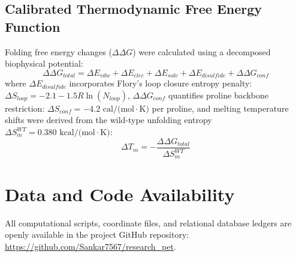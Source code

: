 \documentclass[journal=natcat,manuscript=article]{achemso}
\begin{document}
\subsection{Calibrated Thermodynamic Free Energy Function}
Folding free energy changes ($\Delta\Delta G$) were calculated using a decomposed biophysical potential:
\begin{equation}
\Delta\Delta G_{total} = \Delta E_{vdw} + \Delta E_{elec} + \Delta E_{solv} + \Delta E_{disulfide} + \Delta\Delta G_{conf}
\end{equation}
where $\Delta E_{disulfide}$ incorporates Flory's loop closure entropy penalty: $\Delta S_{loop} = -2.1 - 1.5 R \ln(N_{loop})$, $\Delta\Delta G_{conf}$ quantifies proline backbone restriction: $\Delta S_{conf} = -4.2\text{ cal/(mol}\cdot\text{K)}$ per proline, and melting temperature shifts were derived from the wild-type unfolding entropy $\Delta S_m^{WT} = 0.380\text{ kcal/(mol}\cdot\text{K)}$:
\begin{equation}
\Delta T_m = -\frac{\Delta\Delta G_{total}}{\Delta S_m^{WT}}
\end{equation}

\section{Data and Code Availability}
All computational scripts, coordinate files, and relational database ledgers are openly available in the project GitHub repository: \url{https://github.com/Sankar7567/research_pet}.
\end{document}
